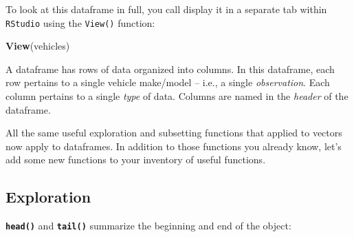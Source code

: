 \documentclass[
]{book}
\newenvironment{Shaded}{\begin{snugshade}}{\end{snugshade}}
\newcommand{\KeywordTok}[1]{\textcolor[rgb]{0.13,0.29,0.53}{\textbf{#1}}}
\newcommand{\NormalTok}[1]{#1}
\begin{document}
To look at this dataframe in full, you call display it in a separate tab within \texttt{RStudio} using the \texttt{View()} function:

\begin{Shaded}
\begin{Highlighting}[]
\KeywordTok{View}\NormalTok{(vehicles)}
\end{Highlighting}
\end{Shaded}

A dataframe has rows of data organized into columns. In this dataframe, each row pertains to a single vehicle make/model -- i.e., a single \emph{observation}. Each column pertains to a single \emph{type} of data. Columns are named in the \emph{header} of the dataframe.

All the same useful exploration and subsetting functions that applied to vectors now apply to dataframes. In addition to those functions you already know, let's add some new functions to your inventory of useful functions.

\hypertarget{exploration}{%
\subsection*{Exploration}\label{exploration}}

\textbf{\texttt{head()}} and \textbf{\texttt{tail()}} summarize the beginning and end of the object:
\end{document}
